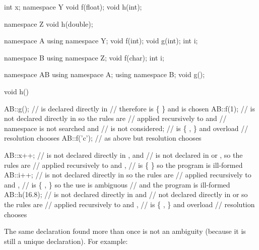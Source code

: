 \begin{codeblock}
int x;
namespace Y {
  void f(float);
  void h(int);
}

namespace Z {
  void h(double);
}

namespace A {
  using namespace Y;
  void f(int);
  void g(int);
  int i;
}

namespace B {
  using namespace Z;
  void f(char);
  int i;
}

namespace AB {
  using namespace A;
  using namespace B;
  void g();
}

void h()
{
  AB::g();          //  is declared directly in 
                    // therefore  is \{  \} and  is chosen
  AB::f(1);         //  is not declared directly in  so the rules are
                    // applied recursively to  and 
                    // namespace  is not searched and 
                    // is not considered;
                    //  is \{ ,  \} and overload
                    // resolution chooses 
  AB::f('c');       // as above but resolution chooses 

  AB::x++;          //  is not declared directly in , and
                    // is not declared in  or  , so the rules are
                    // applied recursively to  and ,
                    //  is \{ \} so the program is ill-formed
  AB::i++;          //  is not declared directly in  so the rules are
                    // applied recursively to  and ,
                    //  is \{  ,  \} so the use is ambiguous
                    // and the program is ill-formed
  AB::h(16.8);      //  is not declared directly in  and
                    // not declared directly in  or  so the rules are
                    // applied recursively to  and ,
                    //  is \{ ,  \} and overload
                    // resolution chooses 
}
\end{codeblock}

\pnum
The same declaration found more than once is not an ambiguity (because
it is still a unique declaration). For example:

